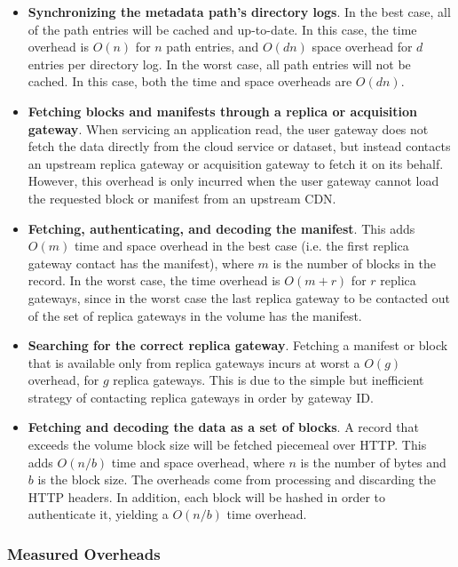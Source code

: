 \begin{itemize}
\item \textbf{Synchronizing the metadata path's directory logs}.
In the best case, all of the path entries will be cached and up-to-date.  In
this case, the time overhead is $O(n)$ for $n$ path entries, and $O(dn)$ space
overhead for $d$ entries per directory log.  In the worst case,
all path entries will not be cached.  In this case, both the time and space
overheads are $O(dn)$.
\item \textbf{Fetching blocks and manifests through a replica or acquisition gateway}.  When
servicing an application read, the user gateway does not fetch the data directly
from the cloud service or dataset, but instead contacts an upstream replica
gateway or acquisition gateway to
fetch it on its behalf.  However, this overhead is only
incurred when the user gateway cannot load the requested block or manifest from
an upstream CDN.
\item \textbf{Fetching, authenticating, and decoding the manifest}.
This adds $O(m)$ time and space overhead in the best case (i.e. the first
replica gateway contact has the manifest),
where $m$ is the number of blocks in the record.  In the worst case, the time overhead is
$O(m + r)$ for $r$ replica gateways, since in the worst case the last replica
gateway to be contacted out of the set of replica gateways in the volume
has the manifest.
\item \textbf{Searching for the correct replica gateway}.  Fetching a manifest
or block that is available only from replica gateways incurs at worst a $O(g)$
overhead, for $g$ replica gateways.  This is due to the simple but inefficient
strategy of contacting replica gateways in order by gateway ID.
\item \textbf{Fetching and decoding the data as a set of blocks}.  A record that exceeds the
volume block size will be fetched piecemeal over HTTP.  This adds $O(n/b)$ time
and space overhead, where $n$ is the number of bytes and $b$ is the block size.
The overheads come from processing and discarding the HTTP headers.  In
addition, each block will be hashed in order to authenticate it,
yielding a $O(n/b)$ time overhead.
\end{itemize}

\subsubsection{Measured Overheads}


